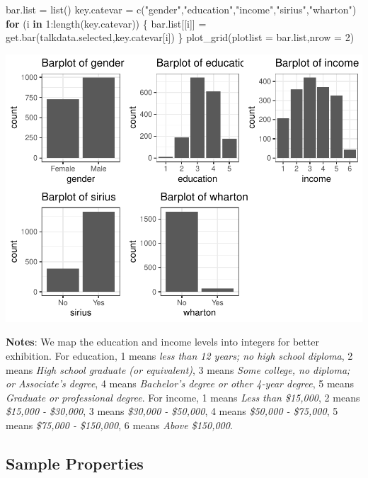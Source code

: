 \documentclass[
  12pt,
]{article}
\newenvironment{Shaded}{\begin{snugshade}}{\end{snugshade}}
\newcommand{\AttributeTok}[1]{\textcolor[rgb]{0.77,0.63,0.00}{#1}}
\newcommand{\ControlFlowTok}[1]{\textcolor[rgb]{0.13,0.29,0.53}{\textbf{#1}}}
\newcommand{\DecValTok}[1]{\textcolor[rgb]{0.00,0.00,0.81}{#1}}
\newcommand{\FunctionTok}[1]{\textcolor[rgb]{0.00,0.00,0.00}{#1}}
\newcommand{\NormalTok}[1]{#1}
\newcommand{\OtherTok}[1]{\textcolor[rgb]{0.56,0.35,0.01}{#1}}
\newcommand{\SpecialCharTok}[1]{\textcolor[rgb]{0.00,0.00,0.00}{#1}}
\newcommand{\StringTok}[1]{\textcolor[rgb]{0.31,0.60,0.02}{#1}}
\begin{document}
\begin{Shaded}
\begin{Highlighting}[]
\NormalTok{bar.list }\OtherTok{=} \FunctionTok{list}\NormalTok{()}
\NormalTok{key.catevar }\OtherTok{=} \FunctionTok{c}\NormalTok{(}\StringTok{"gender"}\NormalTok{,}\StringTok{"education"}\NormalTok{,}\StringTok{"income"}\NormalTok{,}\StringTok{"sirius"}\NormalTok{,}\StringTok{"wharton"}\NormalTok{)}
\ControlFlowTok{for}\NormalTok{ (i }\ControlFlowTok{in} \DecValTok{1}\SpecialCharTok{:}\FunctionTok{length}\NormalTok{(key.catevar)) \{}
\NormalTok{  bar.list[[i]] }\OtherTok{=} \FunctionTok{get.bar}\NormalTok{(talkdata.selected,key.catevar[i])}
\NormalTok{\}}
\FunctionTok{plot\_grid}\NormalTok{(}\AttributeTok{plotlist =}\NormalTok{ bar.list,}\AttributeTok{nrow =} \DecValTok{2}\NormalTok{)}
\end{Highlighting}
\end{Shaded}

\includegraphics{hw1_sol_files/figure-latex/unnamed-chunk-2-2.pdf}

\textbf{Notes}: We map the education and income levels into integers for
better exhibition. For education, 1 means
\textit {less than 12 years; no high school diploma}, 2 means
\textit{   
High school graduate (or equivalent)}, 3 means
\textit{Some college, no diploma; or Associate’s degree}, 4 means
\textit{Bachelor’s degree or other 4-year degree}, 5 means \textit{    
Graduate or professional degree}. For income, 1 means
\textit{Less than \$15,000}, 2 means \textit{ 
\$15,000 - \$30,000}, 3 means \textit{\$30,000 - \$50,000}, 4 means
\textit{    
\$50,000 - \$75,000}, 5 means \textit{
\$75,000 - \$150,000}, 6 means \textit{Above \$150,000}.

\hypertarget{sample-properties}{%
\subsection{Sample Properties}\label{sample-properties}}
\end{document}
